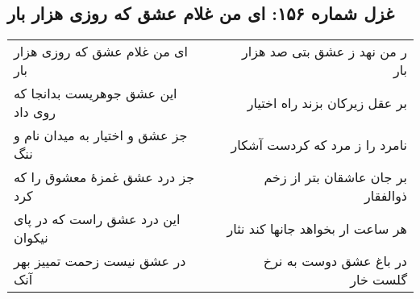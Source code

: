 \begin{center}
\section*{غزل شماره ۱۵۶: ای من غلام عشق که روزی هزار بار}
\label{sec:156}
\begin{longtable}{l p{0.5cm} r}
ای من غلام عشق که روزی هزار بار
&&
ر من نهد ز عشق بتی صد هزار بار
\\
این عشق جوهریست بدانجا که روی داد
&&
بر عقل زیرکان بزند راه اختیار
\\
جز عشق و اختیار به میدان نام و ننگ
&&
نامرد را ز مرد که کردست آشکار
\\
جز درد عشق غمزهٔ معشوق را که کرد
&&
بر جان عاشقان بتر از زخم ذوالفقار
\\
این درد عشق راست که در پای نیکوان
&&
هر ساعت ار بخواهد جانها کند نثار
\\
در عشق نیست زحمت تمییز بهر آنک
&&
در باغ عشق دوست به نرخ گلست خار
\\
\end{longtable}
\end{center}
